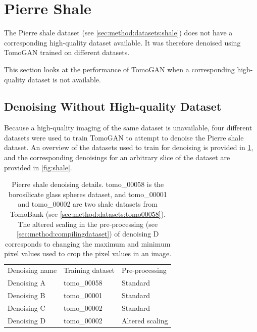 \section{Pierre Shale}
The Pierre shale dataset (see \cref{sec:method:datasets:shale}) does not have a corresponding high-quality dataset available. It was therefore denoised using TomoGAN trained on different datasets. 

This section looks at the performance of TomoGAN when a corresponding high-quality dataset is not available. 

\subsection{Denoising Without High-quality Dataset}
Because a high-quality imaging of the same dataset is unavailable, four different datasets were used to train TomoGAN to attempt to denoise the Pierre shale dataset. An overview of the datasets used to train for denoising is provided in \cref{tab:pierreshaledenoisingdetails}, and the corresponding denoisings for an arbitrary slice of the dataset are provided in \cref{fig:shale}. 

\begin{table}[htbp]
  \centering
  \caption[Pierre shale denoising details]{Pierre shale denoising details. tomo\_00058 is the borosilicate glass spheres dataset, and tomo\_00001 and tomo\_00002 are two shale datasets from TomoBank (see \cref{sec:method:datasets:tomo00058}). The altered scaling in the pre-processing (see \cref{sec:method:compilingdataset}) of denoising D corresponds to changing the maximum and minimum pixel values used to crop the pixel values in an image. }
  \label{tab:pierreshaledenoisingdetails}
  \begin{tabular}{lll}
  \hline
  Denoising name & Training dataset & Pre-processing\\
  \hhline{===}
  Denoising A & tomo\_00058 & Standard \\
  Denoising B & tomo\_00001 & Standard \\
  Denoising C & tomo\_00002 & Standard \\
  Denoising D & tomo\_00002 & Altered scaling \\
  \hline
  \end{tabular}
\end{table}

